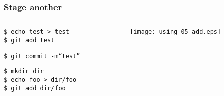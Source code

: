 \documentclass[english]{beamer}
\newcommand{\CMD}[1]{%
\texttt{\textcolor{code-green}{#1}}%
}
\newcommand{\cmd}[1]{%
\texttt{\textcolor{code-orange}{#1}}%
}
\begin{document}
\begin{frame}
\frametitle{Stage another}
\begin{columns}[t]
        \begin{column}[T]{.5\textwidth}
                \cmd{\$ echo test > test} \\
                \CMD{\$ git add test}

                \vspace{.1\textheight}

                \CMD{\$ git commit -m``test''} \\

                \vspace{.1\textheight}

                \cmd{\$ mkdir dir} \\
                \cmd{\$ echo foo > dir/foo} \\
                \CMD{\$ git add dir/foo}
        \end{column}
        \begin{column}[T]{.5\textwidth}

                \texttt{[image: using-05-add.eps]}

        \end{column}
\end{columns}
\end{frame}
\end{document}
